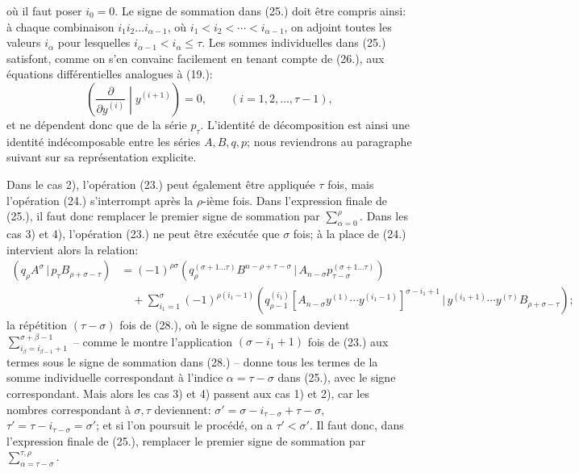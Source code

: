 \documentclass[11pt]{article}
\newcommand{\pair}[2]{(#1\,|\,#2)}
\begin{document}
où il faut poser $i_0=0$. Le signe de sommation dans (25.) doit être compris ainsi: à chaque combinaison $i_1i_2\ldots i_{\alpha-1}$, où $i_1<i_2<\cdots<i_{\alpha-1}$, on adjoint toutes les valeurs $i_\alpha$ pour lesquelles $i_{\alpha-1}<i_\alpha\le\tau$. Les sommes individuelles dans (25.) satisfont, comme on s'en convainc facilement en tenant compte de (26.), aux équations différentielles analogues à (19.):
\begin{equation}
 \left(\frac{\partial}{\partial y^{(i)}}\middle|y^{(i+1)}\right)=0,
 \qquad (i=1,2,\ldots,\tau-1),
\tag{27}
\end{equation}
et ne dépendent donc que de la série $p_\tau$. L'identité de décomposition est ainsi une identité indécomposable entre les séries $A,B,q,p$; nous reviendrons au paragraphe suivant sur sa représentation explicite.

Dans le cas 2), l'opération (23.) peut également être appliquée $\tau$ fois, mais l'opération (24.) s'interrompt après la $\rho$-ième fois. Dans l'expression finale de (25.), il faut donc remplacer le premier signe de sommation par $\sum_{\alpha=0}^{\rho}$. Dans les cas 3) et 4), l'opération (23.) ne peut être exécutée que $\sigma$ fois; à la place de (24.) intervient alors la relation:
\begin{equation}
\begin{aligned}
\pair{q_\rho A^\sigma}{p_\tau B_{\rho+\sigma-\tau}}
&=(-1)^{\rho\sigma}
 \pair{q_\rho^{(\sigma+1\ldots\tau)}B^{n-\rho+\tau-\sigma}}{A_{n-\sigma}p_{\tau-\sigma}^{(\sigma+1\ldots\tau)}}\\
&\quad+\sum_{i_1=1}^{\sigma}(-1)^{\rho(i_1-1)}
 \pair{q_{\rho-1}^{(i_1)}[A_{n-\sigma}y^{(1)}\cdots y^{(i_1-1)}]^{\sigma-i_1+1}}
 {y^{(i_1+1)}\cdots y^{(\tau)}B_{\rho+\sigma-\tau}};
\end{aligned}
\tag{28}
\end{equation}
la répétition $(\tau-\sigma)$ fois de (28.), où le signe de sommation devient $\sum_{i_\beta=i_{\beta-1}+1}^{\sigma+\beta-1}$ -- comme le montre l'application $(\sigma-i_1+1)$ fois de (23.) aux termes sous le signe de sommation dans (28.) -- donne tous les termes de la somme individuelle correspondant à l'indice $\alpha=\tau-\sigma$ dans (25.), avec le signe correspondant. Mais alors les cas 3) et 4) passent aux cas 1) et 2), car les nombres correspondant à $\sigma,\tau$ deviennent: $\sigma'=\sigma-i_{\tau-\sigma}+\tau-\sigma$, $\tau'=\tau-i_{\tau-\sigma}=\sigma'$; et si l'on poursuit le procédé, on a $\tau'<\sigma'$. Il faut donc, dans l'expression finale de (25.), remplacer le premier signe de sommation par $\sum_{\alpha=\tau-\sigma}^{\tau,\rho}$.
\end{document}
